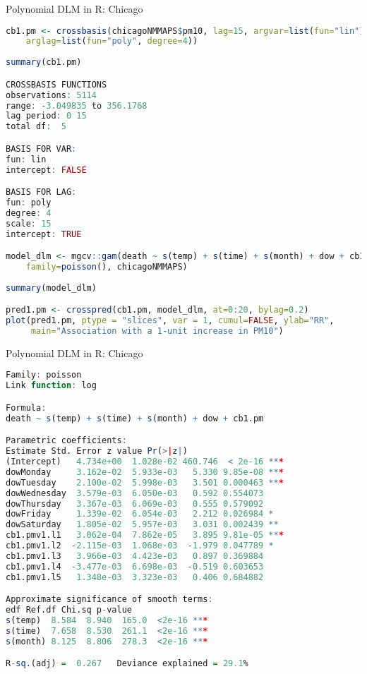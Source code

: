 \documentclass{beamer}
\begin{document}
\begin{frame}[fragile]{Polynomial DLM in R: Chicago}
	\begin{lstlisting}[language=R, basicstyle=\tiny]
cb1.pm <- crossbasis(chicagoNMMAPS$pm10, lag=15, argvar=list(fun="lin"),
	arglag=list(fun="poly", degree=4))
	
summary(cb1.pm)

CROSSBASIS FUNCTIONS
observations: 5114 
range: -3.049835 to 356.1768 
lag period: 0 15 
total df:  5 

BASIS FOR VAR:
fun: lin 
intercept: FALSE 

BASIS FOR LAG:
fun: poly 
degree: 4 
scale: 15 
intercept: TRUE 

model_dlm <- mgcv::gam(death ~ s(temp) + s(time) + s(month) + dow + cb1.pm,
	family=poisson(), chicagoNMMAPS)
	
summary(model_dlm)

pred1.pm <- crosspred(cb1.pm, model_dlm, at=0:20, bylag=0.2)
plot(pred1.pm, ptype = "slices", var = 1, cumul=FALSE, ylab="RR",
	 main="Association with a 1-unit increase in PM10")
	\end{lstlisting}
\end{frame}

\begin{frame}[fragile]{Polynomial DLM in R: Chicago}
	\begin{lstlisting}[language=R, basicstyle=\tiny]
Family: poisson 
Link function: log 

Formula:
death ~ s(temp) + s(time) + s(month) + dow + cb1.pm

Parametric coefficients:
Estimate Std. Error z value Pr(>|z|)    
(Intercept)   4.734e+00  1.028e-02 460.746  < 2e-16 ***
dowMonday     3.162e-02  5.933e-03   5.330 9.85e-08 ***
dowTuesday    2.100e-02  5.998e-03   3.501 0.000463 ***
dowWednesday  3.579e-03  6.050e-03   0.592 0.554073    
dowThursday   3.367e-03  6.069e-03   0.555 0.579092    
dowFriday     1.339e-02  6.054e-03   2.212 0.026984 *  
dowSaturday   1.805e-02  5.957e-03   3.031 0.002439 ** 
cb1.pmv1.l1   3.062e-04  7.862e-05   3.895 9.81e-05 ***
cb1.pmv1.l2  -2.115e-03  1.068e-03  -1.979 0.047789 *  
cb1.pmv1.l3   3.966e-03  4.423e-03   0.897 0.369884    
cb1.pmv1.l4  -3.477e-03  6.698e-03  -0.519 0.603653    
cb1.pmv1.l5   1.348e-03  3.323e-03   0.406 0.684882    

Approximate significance of smooth terms:
edf Ref.df Chi.sq p-value    
s(temp)  8.584  8.940  165.0  <2e-16 ***
s(time)  7.658  8.530  261.1  <2e-16 ***
s(month) 8.125  8.806  278.3  <2e-16 ***

R-sq.(adj) =  0.267   Deviance explained = 29.1%
	\end{lstlisting}
\end{frame}
\end{document}
